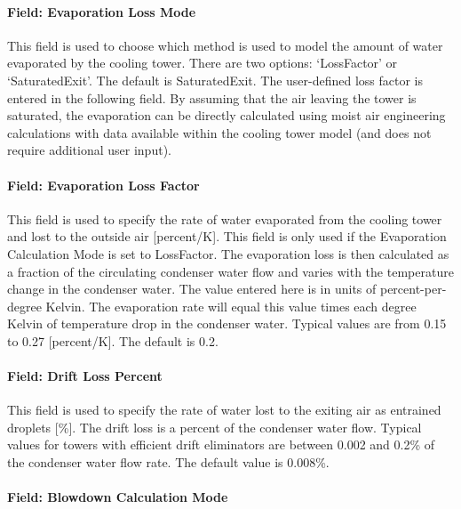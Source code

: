 \paragraph{Field: Evaporation Loss Mode}\label{field-evaporation-loss-mode-1}

This field is used to choose which method is used to model the amount of water evaporated by the cooling tower. There are two options: `LossFactor' or `SaturatedExit'. The default is SaturatedExit. The user-defined loss factor is entered in the following field. By assuming that the air leaving the tower is saturated, the evaporation can be directly calculated using moist air engineering calculations with data available within the cooling tower model (and does not require additional user input).

\paragraph{Field: Evaporation Loss Factor}\label{field-evaporation-loss-factor-1}

This field is used to specify the rate of water evaporated from the cooling tower and lost to the outside air {[}percent/K{]}. This field is only used if the Evaporation Calculation Mode is set to LossFactor. The evaporation loss is then calculated as a fraction of the circulating condenser water flow and varies with the temperature change in the condenser water. The value entered here is in units of percent-per-degree Kelvin. The evaporation rate will equal this value times each degree Kelvin of temperature drop in the condenser water. Typical values are from 0.15 to 0.27 {[}percent/K{]}. The default is 0.2.

\paragraph{Field: Drift Loss Percent}\label{field-drift-loss-percent-1}

This field is used to specify the rate of water lost to the exiting air as entrained droplets {[}\%{]}. The drift loss is a percent of the condenser water flow. Typical values for towers with efficient drift eliminators are between 0.002 and 0.2\% of the condenser water flow rate. The default value is 0.008\%.

\paragraph{Field: Blowdown Calculation Mode}\label{field-blowdown-calculation-mode-1}


